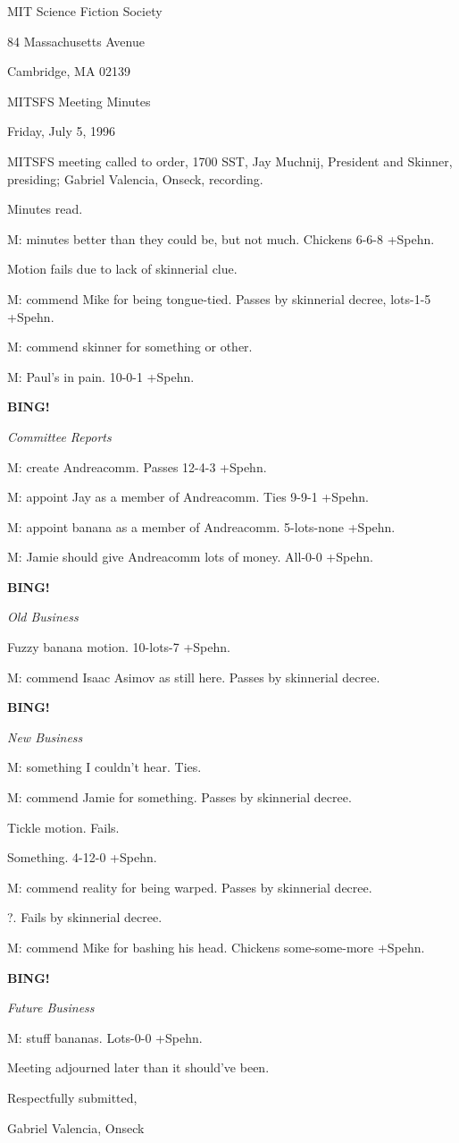 \documentclass[12pt]{article}
\newcommand{\bing}{{\bf BING!} }
\newcommand{\goto}[1]{\bing \vskip 12pt \centerline{{\em{#1}}}}
\begin{document}
\begin{center}

MIT Science Fiction Society 

84 Massachusetts Avenue

Cambridge, MA 02139

\vspace{12pt}

MITSFS Meeting Minutes 

Friday, July 5, 1996

\end{center}
 
\vspace{18pt}

\setlength{\parskip}{6pt}

\noindent
MITSFS meeting called to order, 1700 SST,
Jay Muchnij, President and Skinner, presiding; Gabriel Valencia, Onseck, recording.

Minutes read.

M: minutes better than they could be, but not much. Chickens 6-6-8 +Spehn.

Motion fails due to lack of skinnerial clue.

M: commend Mike for being tongue-tied. Passes by skinnerial decree, lots-1-5 +Spehn.

M: commend skinner for something or other.

M: Paul's in pain. 10-0-1 +Spehn.

\goto{Committee Reports}

M: create Andreacomm. Passes 12-4-3 +Spehn.

M: appoint Jay as a member of Andreacomm. Ties 9-9-1 +Spehn.

M: appoint banana as a member of Andreacomm. 5-lots-none +Spehn.

M: Jamie should give Andreacomm lots of money. All-0-0 +Spehn.

\goto{Old Business}

Fuzzy banana motion. 10-lots-7 +Spehn.

M: commend Isaac Asimov as still here. Passes by skinnerial decree.

\goto{New Business}

M: something I couldn't hear. Ties.

M: commend Jamie for something. Passes by skinnerial decree.

Tickle motion. Fails.

Something. 4-12-0 +Spehn.

M: commend reality for being warped. Passes by skinnerial decree.

?. Fails by skinnerial decree.

M: commend Mike for bashing his head. Chickens some-some-more +Spehn.

\goto{Future Business}

M: stuff bananas. Lots-0-0 +Spehn.

\vspace{12pt}

\noindent
Meeting adjourned later than it should've been.

\vspace{18pt}

\centerline{Respectfully submitted,}
\centerline{Gabriel Valencia, Onseck}
\end{document}
